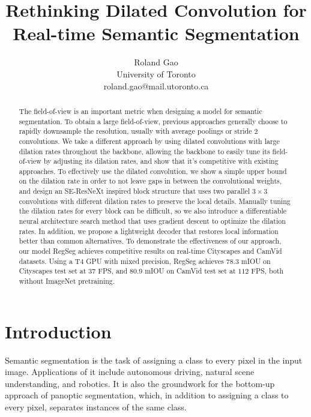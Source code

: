 \documentclass[10pt,twocolumn,letterpaper]{article}
\begin{document}
\title{Rethinking Dilated Convolution for Real-time Semantic Segmentation}

\author{Roland Gao\\
University of Toronto\\
roland.gao@mail.utoronto.ca\\
}
\maketitle

\begin{abstract}
The field-of-view is an important metric when designing a model for semantic segmentation. To obtain a large field-of-view, previous approaches generally choose to rapidly downsample the resolution, usually with average poolings or stride 2 convolutions. We take a different approach by using dilated convolutions with large dilation rates throughout the backbone, allowing the backbone to easily tune its field-of-view by adjusting its dilation rates, and show that it's competitive with existing approaches. To effectively use the dilated convolution, we show a simple upper bound on the dilation rate in order to not leave gaps in between the convolutional weights, and design an SE-ResNeXt inspired block structure that uses two parallel $3\times 3$ convolutions with different dilation rates to preserve the local details. Manually tuning the dilation rates for every block can be difficult, so we also introduce a differentiable neural architecture search method that uses gradient descent to optimize the dilation rates. In addition, we propose a lightweight decoder that restores local information better than common alternatives. To demonstrate the effectiveness of our approach, our model RegSeg achieves competitive results on real-time Cityscapes and CamVid datasets. Using a T4 GPU with mixed precision, RegSeg achieves 78.3 mIOU on Cityscapes test set at $37$ FPS, and 80.9 mIOU on CamVid test set at $112$ FPS, both without ImageNet pretraining.
\end{abstract}


\section{Introduction}
\label{sec:intro}

Semantic segmentation is the task of assigning a class to every pixel in the input image. Applications of it include autonomous driving, natural scene understanding, and robotics. It is also the groundwork for the bottom-up approach\cite{panoptic_deeplab_2020} of panoptic segmentation, which, in addition to assigning a class to every pixel, separates instances of the same class.
\end{document}
